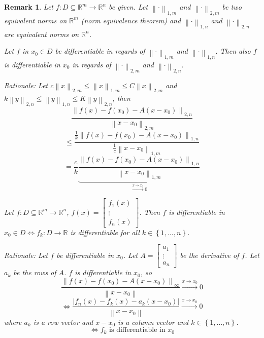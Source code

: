 \documentclass{article}
\newtheorem{remark}{Remark}  \numberwithin{remark}{section}
\newcommand{\set}[1]{\left\{#1\right\}}
\newcommand{\norm}[1]{\left\|#1\right\|}
\newcommand{\card}[1]{\left|#1\right|}
\begin{document}
\begin{remark}
  Let $f: D \subseteq \mathbb R^m \to \mathbb R^n$ be given.
  Let $\norm{\cdot}_{1,m}$ and $\norm{\cdot}_{2,m}$ be two equivalent norms on $\mathbb R^m$ (norm equivalence theorem)
  and $\norm{\cdot}_{1,n}$ and $\norm{\cdot}_{2,n}$ are equivalent norms on $\mathbb R^n$.

  Let $f$ in $x_0 \in D$ be differentiable in regards of $\norm{\cdot}_{1,m}$ and $\norm{\cdot}_{1,n}$.
  Then also $f$ is differentiable in $x_0$ in regards of $\norm{\cdot}_{2,m}$ and $\norm{\cdot}_{2,n}$.

  \emph{Rationale:} Let $c \norm{x}_{2,m} \leq \norm{x}_{1,m} \leq C \norm{x}_{2,m}$ and
  $k \norm{y}_{2,n} \leq \norm{y}_{1,n} \leq K \norm{y}_{2,n}$, then
  \[ \frac{\norm{f(x) - f(x_0) - A(x - x_0)}_{2,n}}{\norm{x - x_0}_{2,m}} \]
  \[ \leq \frac{\frac1k \norm{f(x) - f(x_0) - A(x - x_0)}_{1,n}}{\frac1c \norm{x - x_0}_{1,m}} \]
  \[ = \frac ck \underbrace{\frac{\norm{f(x) - f(x_0) - A (x - x_0)}_{1,n}}{\norm{x - x_0}_{1,m}}}_{\xrightarrow{x \to x_0} 0} \]

  Let $f: D \subseteq \mathbb R^m \to \mathbb R^n$, $f(x) = \begin{bmatrix} f_1(x) \\ \vdots \\ f_n(x) \end{bmatrix}$.
  Then $f$ is differentiable in $x_0 \in D \iff f_k: D \to \mathbb R$ is differentiable for all $k \in \set{1, \dots, n}$.
  
  \emph{Rationale:} Let $f$ be differentiable in $x_0$. Let $A = \begin{bmatrix} a_1 \\ \vdots \\ a_n \end{bmatrix}$ be the derivative of $f$.
  Let $a_k$ be the rows of $A$. $f$ is differentiable in $x_0$, so
  \[ \frac{\norm{f(x) - f(x_0) - A(x - x_0)}_{\infty}}{\norm{x - x_0}} \xrightarrow{x \to x_0} 0 \]
  \[ \iff \frac{\card{f_n(x) - f_k(x) - a_k(x - x_0)}}{\norm{x - x_0}} \xrightarrow{x \to x_0} 0 \]
  where $a_k$ is a row vector and $x-x_0$ is a column vector and $k \in \set{1, \dots, n}$.
  \[ \iff f_k \text{ is differentiable in } x_0 \]
\end{remark}
\end{document}
